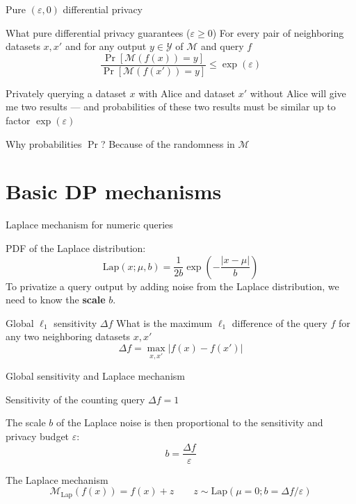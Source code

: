 \documentclass[12pt,aspectratio=169,handout]{beamer}
\begin{document}
\begin{frame}{Pure $(\varepsilon, 0)$ differential privacy}
	
\begin{block}{What pure differential privacy guarantees ($\varepsilon \geq 0$)}
	For every pair of neighboring datasets $x, x'$ and for any output $y \in \mathcal{Y}$ of $\mathcal{M}$ and query $f$
	$$
	\frac{
		\Pr \left[ \mathcal{M}(f(x)) = y  \right]
	}{
		\Pr \left[ \mathcal{M}(f(x')) = y  \right]
	}
	\leq \exp(\varepsilon)
	$$
\end{block}

Privately querying a dataset $x$ with Alice and dataset $x'$ without Alice will give me two results --- and probabilities of these two results must be similar up to factor $\exp(\varepsilon)$

Why probabilities $\Pr$? Because of the randomness in $\mathcal{M}$	
\end{frame}

\section{Basic DP mechanisms}

\begin{frame}{Laplace mechanism for numeric queries}

PDF of the Laplace distribution:
$$
\mathrm{Lap}(x; \mu, b) = \frac{1}{2b} \exp \left( - \frac{| x - \mu |}{b} \right)
$$
To privatize a query output by adding noise from the Laplace distribution, we need to know the \textbf{scale} $b$.

\begin{block}{Global $\ell_1$ sensitivity $\Delta f$}
What is the maximum $\ell_1$ difference of the query $f$ for any two neighboring datasets $x, x'$ 
$$
\Delta f = \max_{x, x'} | f(x) - f(x')|
$$
\end{block}
	
\end{frame}

\begin{frame}{Global sensitivity and Laplace mechanism}

\begin{example}
Sensitivity of the counting query $\Delta f = 1$
\end{example}

The scale $b$ of the Laplace noise is then proportional to the sensitivity and privacy budget $\varepsilon$:
$$
b = \frac{\Delta f}{\varepsilon}
$$


\begin{block}{The Laplace mechanism}
$$
\mathcal{M_{\mathrm{Lap}}}(f(x)) = f(x) + z \qquad
z \sim \textrm{Lap}(\mu = 0; b = \Delta f / \varepsilon)
$$
\end{block}

\end{frame}
\end{document}
